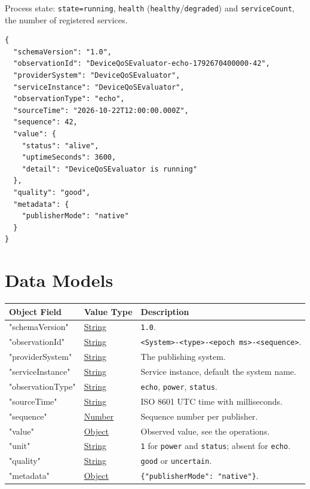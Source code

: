 \documentclass[a4paper]{arrowhead}
\newcommand{\oref}[1]{{\textcolor{ArrowheadBlue}{\hyperref[sec:operations:#1]{#1}}}}
\newcommand{\pref}[1]{{\textcolor{ArrowheadGrey}{\hyperref[sec:model:primitives:#1]{#1}}}}
\begin{document}
Process state: \texttt{state=\allowbreak{}running}, \texttt{health} (\texttt{healthy}/\texttt{degraded}) and \texttt{serviceCount}, the number of registered services.

\begin{lstlisting}[caption={An \oref{echo} observation.}]
{
  "schemaVersion": "1.0",
  "observationId": "DeviceQoSEvaluator-echo-1792670400000-42",
  "providerSystem": "DeviceQoSEvaluator",
  "serviceInstance": "DeviceQoSEvaluator",
  "observationType": "echo",
  "sourceTime": "2026-10-22T12:00:00.000Z",
  "sequence": 42,
  "value": {
    "status": "alive",
    "uptimeSeconds": 3600,
    "detail": "DeviceQoSEvaluator is running"
  },
  "quality": "good",
  "metadata": {
    "publisherMode": "native"
  }
}
\end{lstlisting}

\newpage

\section{Data Models}
\label{sec:model}


\noindent\begin{tabularx}{\textwidth}{| p{4.25cm} | p{3.5cm} | X |} \hline
\rowcolor{gray!33} Object Field & Value Type & Description \\ \hline
"schemaVersion" & \pref{String} & \texttt{1.0}. \\ \hline
"observationId" & \pref{String} & \texttt{<System>-<type>-<epoch ms>-<sequence>}. \\ \hline
"providerSystem" & \pref{String} & The publishing system. \\ \hline
"serviceInstance" & \pref{String} & Service instance, default the system name. \\ \hline
"observationType" & \pref{String} & \texttt{echo}, \texttt{power}, \texttt{status}. \\ \hline
"sourceTime" & \pref{String} & ISO 8601 UTC time with milliseconds. \\ \hline
"sequence" & \pref{Number} & Sequence number per publisher. \\ \hline
"value" & \pref{Object} & Observed value, see the operations. \\ \hline
"unit" & \pref{String} & \texttt{1} for \texttt{power} and \texttt{status}; absent for \texttt{echo}. \\ \hline
"quality" & \pref{String} & \texttt{good} or \texttt{uncertain}. \\ \hline
"metadata" & \pref{Object} & \texttt{\{"publisherMode": "native"\}}. \\ \hline
\end{tabularx}
\end{document}
